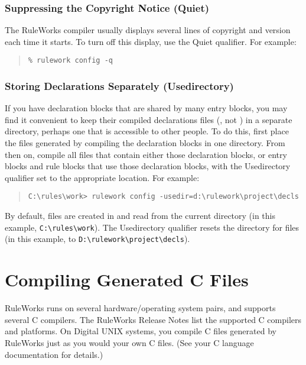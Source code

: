 \subsubsection{Suppressing the Copyright Notice (Quiet)}

The RuleWorks compiler usually displays several lines of copyright and
version each time it starts. To turn off this display, use the Quiet
qualifier. For example:

\begin{quote}
\begin{verbatim}
% rulework config -q
\end{verbatim}
\end{quote}

\subsubsection{Storing Declarations Separately (Usedirectory)}

If you have declaration blocks that are shared by many entry blocks,
you may find it convenient to keep their compiled declarations files
(, not ) in a separate directory, perhaps one that is
accessible to other people. To do this, first place the 
files generated by compiling the declaration blocks in one directory.
From then on, compile all files that contain either those declaration
blocks, or entry blocks and rule blocks that use those declaration
blocks, with the Usedirectory qualifier set to the appropriate
location. For example:

\begin{quote}
\begin{verbatim}
C:\rules\work> rulework config -usedir=d:\rulework\project\decls
\end{verbatim}
\end{quote}

By default,  files are created in and read from the current
directory (in this example, \verb|C:\rules\work|). The Usedirectory
qualifier resets the directory for  files (in this example,
to \verb|D:\rulework\project\decls|).

\section{Compiling Generated C Files}

RuleWorks runs on several hardware/operating system pairs, and
supports several C compilers. The RuleWorks Release Notes list the
supported C compilers and platforms. On Digital UNIX systems, you
compile C files generated by RuleWorks just as you would your own C
files. (See your C language documentation for details.)

